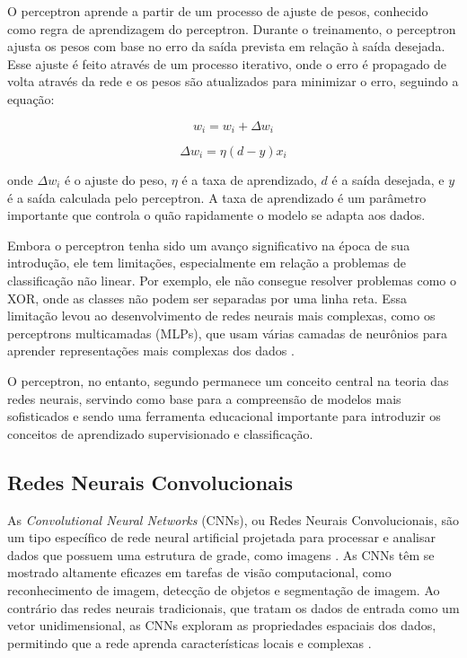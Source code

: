 O perceptron aprende a partir de um processo de ajuste de pesos, conhecido como regra de aprendizagem do perceptron. Durante o treinamento, o perceptron ajusta os pesos com base no erro da saída prevista em relação à saída desejada. Esse ajuste é feito através de um processo iterativo, onde o erro é propagado de volta através da rede e os pesos são atualizados para minimizar o erro, seguindo a equação:

\[
w_i = w_i + \Delta w_i
\]

\[
\Delta w_i = \eta (d - y) x_i
\]

onde \( \Delta w_i \) é o ajuste do peso, \( \eta \) é a taxa de aprendizado, \( d \) é a saída desejada, e \( y \) é a saída calculada pelo perceptron. A taxa de aprendizado é um parâmetro importante que controla o quão rapidamente o modelo se adapta aos dados.

Embora o perceptron tenha sido um avanço significativo na época de sua introdução, ele tem limitações, especialmente em relação a problemas de classificação não linear. Por exemplo, ele não consegue resolver problemas como o XOR, onde as classes não podem ser separadas por uma linha reta. Essa limitação levou ao desenvolvimento de redes neurais mais complexas, como os perceptrons multicamadas (MLPs), que usam várias camadas de neurônios para aprender representações mais complexas dos dados \cite{bishop2006pattern}. %

O perceptron, no entanto, segundo  permanece um conceito central na teoria das redes neurais, servindo como base para a compreensão de modelos mais sofisticados e sendo uma ferramenta educacional importante para introduzir os conceitos de aprendizado supervisionado e classificação.


\subsection{Redes Neurais Convolucionais}

As \textit{Convolutional Neural Networks} (CNNs), ou Redes Neurais Convolucionais, são um tipo específico de rede neural artificial projetada para processar e analisar dados que possuem uma estrutura de grade, como imagens \cite{o2015introduction}. As CNNs têm se mostrado altamente eficazes em tarefas de visão computacional, como reconhecimento de imagem, detecção de objetos e segmentação de imagem. Ao contrário das redes neurais tradicionais, que tratam os dados de entrada como um vetor unidimensional, as CNNs exploram as propriedades espaciais dos dados, permitindo que a rede aprenda características locais e complexas \cite{nielsen2015neural}.

